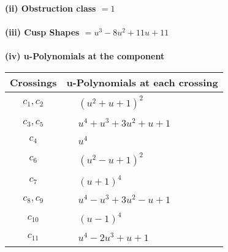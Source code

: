 \documentclass[1p]{elsarticle_modified}
\theoremstyle{definition}
\begin{document}
\flushleft \textbf{(ii) Obstruction class $= 1$}\\~\\
\flushleft \textbf{(iii) Cusp Shapes $= u^3-8 u^2+11 u+11$}\\~\\
\newpage\renewcommand{\arraystretch}{1}
\flushleft \textbf{(iv) u-Polynomials at the component}\newline \\
\begin{tabular}{m{50pt}|m{274pt}}
Crossings & \hspace{64pt}u-Polynomials at each crossing \\
\hline $$\begin{aligned}c_{1},c_{2}\end{aligned}$$&$\begin{aligned}
&(u^2+u+1)^2
\end{aligned}$\\
\hline $$\begin{aligned}c_{3},c_{5}\end{aligned}$$&$\begin{aligned}
&u^4+u^3+3 u^2+u+1
\end{aligned}$\\
\hline $$\begin{aligned}c_{4}\end{aligned}$$&$\begin{aligned}
&u^4
\end{aligned}$\\
\hline $$\begin{aligned}c_{6}\end{aligned}$$&$\begin{aligned}
&(u^2- u+1)^2
\end{aligned}$\\
\hline $$\begin{aligned}c_{7}\end{aligned}$$&$\begin{aligned}
&(u+1)^4
\end{aligned}$\\
\hline $$\begin{aligned}c_{8},c_{9}\end{aligned}$$&$\begin{aligned}
&u^4- u^3+3 u^2- u+1
\end{aligned}$\\
\hline $$\begin{aligned}c_{10}\end{aligned}$$&$\begin{aligned}
&(u-1)^4
\end{aligned}$\\
\hline $$\begin{aligned}c_{11}\end{aligned}$$&$\begin{aligned}
&u^4-2 u^3+u+1
\end{aligned}$\\
\hline
\end{tabular}\\~\\
\end{document}
